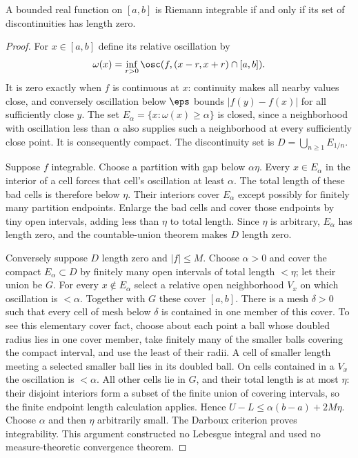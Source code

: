 \begin{theorem}
A bounded real function on $[a,b]$ is Riemann integrable if and only if
its set of discontinuities has length zero.
\end{theorem}
\begin{proof}
For $x\in[a,b]$ define its relative oscillation by
\[\omega(x)=\inf_{r>0}\osc(f,(x-r,x+r)\cap[a,b]).\]
It is zero exactly when $f$ is continuous at $x$: continuity makes all
nearby values close, and conversely oscillation below $\eps$ bounds
$|f(y)-f(x)|$ for all sufficiently close $y$. The set
$E_\alpha=\{x:\omega(x)\ge\alpha\}$ is closed, since a neighborhood
with oscillation less than $\alpha$ also supplies such a neighborhood
at every sufficiently close point. It is consequently compact.
The discontinuity set is $D=\bigcup_{n\ge1}E_{1/n}$.

Suppose $f$ integrable. Choose a partition with gap below $\alpha\eta$.
Every $x\in E_\alpha$ in the interior of a cell forces that cell's
oscillation at least $\alpha$. The total length of these bad cells
is therefore below $\eta$. Their interiors cover $E_\alpha$ except
possibly for finitely many partition endpoints. Enlarge the bad cells
and cover those endpoints by tiny open intervals, adding less than $\eta$
to total length. Since $\eta$ is arbitrary, $E_\alpha$ has length zero,
and the countable-union theorem makes $D$ length zero.

Conversely suppose $D$ length zero and $|f|\le M$.
Choose $\alpha>0$ and cover the compact $E_\alpha\subset D$ by finitely
many open intervals of total length $<\eta$; let their union be $G$.
For every $x\notin E_\alpha$ select a relative open neighborhood $V_x$
on which oscillation is $<\alpha$. Together with $G$ these cover $[a,b]$.
There is a mesh $\delta>0$ such that every cell of mesh below $\delta$
is contained in one member of this cover. To see this elementary cover
fact, choose about each point a ball whose doubled radius lies in one
cover member, take finitely many of the smaller balls covering the compact
interval, and use the least of their radii. A cell of smaller length
meeting a selected smaller ball lies in its doubled ball.
On cells contained in a $V_x$ the oscillation is $<\alpha$.
All other cells lie in $G$, and their total length is at most $\eta$:
their disjoint interiors form a subset of the finite union of covering
intervals, so the finite endpoint length calculation applies.
Hence $U-L\le\alpha(b-a)+2M\eta$. Choose $\alpha$ and then $\eta$
arbitrarily small. The Darboux criterion proves integrability.
This argument constructed no Lebesgue integral and used no measure-theoretic
convergence theorem.
\end{proof}


